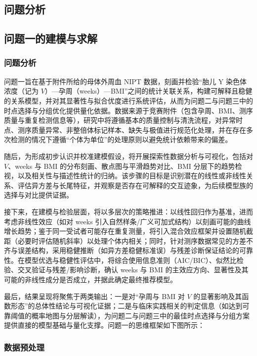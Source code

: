 \documentclass[withoutpreface]{cumcmthesis}
\begin{document}
\subsection{问题分析}

\subsection{问题一的建模与求解}
\subsubsection{问题分析}

问题一旨在基于附件所给的母体外周血 NIPT 数据，刻画并检验“胎儿 Y 染色体浓度（记为 $V$）—孕周（weeks）—BMI”之间的统计关联关系，构建可解释且稳健的关系模型，并对其显著性与拟合优度进行系统评估，从而为问题二与问题三中的时点选择与分组优化提供量化依据。数据来源于竞赛附件（包含孕周、BMI、测序质量与重复检测信息等），研究中将遵循基本的质量控制与清洗流程，对异常时点、测序质量异常、非整倍体标记样本、缺失与极值进行规范化处理，并在存在多次检测的情况下遵循“个体为单位”的处理原则以避免统计依赖带来的偏差。

随后，为形成初步认识并校准建模假设，将开展探索性数据分析与可视化，包括对 $V$、weeks 与 BMI 的分布刻画、散点图与平滑趋势对比、BMI 分层下的趋势检视，以及相关性与描述性统计的归纳。该步骤的目标是识别潜在的线性或非线性关系、评估异方差与长尾特征，并观察是否存在可解释的交互迹象，为后续模型族的选择与对比提供证据。

接下来，在建模与检验层面，将以多层次的策略推进：以线性回归作为基准，进而考虑非线性效应（如对 weeks 引入自然样条/广义可加式结构）以刻画可能的曲线增长趋势；鉴于同一受试者可能存在重复测量，将引入混合效应框架并设置随机截距（必要时评估随机斜率）以处理个体内相关；同时，针对测序数据常见的方差不齐与误差结构，采用稳健推断（如异方差稳健标准误）与残差诊断保证结论的可靠性。在模型优选与稳健性评估中，将综合使用信息准则（AIC/BIC）、似然比检验、交叉验证与残差/影响诊断，确认 weeks 与 BMI 的主效应方向、显著性及其可能的非线性成分是否成立，并据此确定最终推荐模型。

最后，结果呈现将聚焦于两类输出：一是对“孕周与 BMI 对 $V$ 的显著影响及其函数形态”的总体性结论与可视化证据；二是与临床实践相关的判定信息（如达到可靠阈值的概率地图与分层解读），为问题二与问题三中的最佳时点选择与分组方案提供直接的模型基础与量化支撑。问题一的思维框架如下图所示：

\subsubsection{数据预处理}
\end{document}
